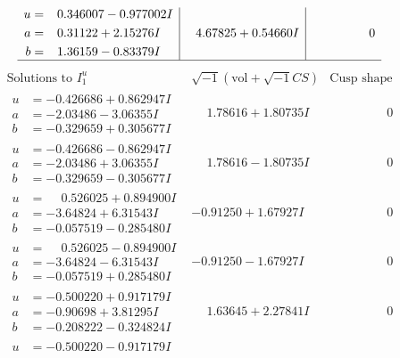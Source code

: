 \documentclass[1p]{elsarticle_modified}
\theoremstyle{definition}
\newcommand{\I}{\sqrt{-1}}
\begin{document}
$$\begin{array}{c|c|c}
\begin{aligned}
u &= \phantom{-}0.346007 - 0.977002 I \\
a &= \phantom{-}0.31122 + 2.15276 I \\
b &= \phantom{-}1.36159 - 0.83379 I\end{aligned}
 & \phantom{-}4.67825 + 0.54660 I & \phantom{-0.000000 } 0\\
 \hline 
 \end{array}$$\newpage$$\begin{array}{c|c|c}  
\text{Solutions to }I^u_{1}& \I (\text{vol} + \sqrt{-1}CS) & \text{Cusp shape}\\
 \hline 
\begin{aligned}
u &= -0.426686 + 0.862947 I \\
a &= -2.03486 - 3.06355 I \\
b &= -0.329659 + 0.305677 I\end{aligned}
 & \phantom{-}1.78616 + 1.80735 I & \phantom{-0.000000 } 0 \\ \hline\begin{aligned}
u &= -0.426686 - 0.862947 I \\
a &= -2.03486 + 3.06355 I \\
b &= -0.329659 - 0.305677 I\end{aligned}
 & \phantom{-}1.78616 - 1.80735 I & \phantom{-0.000000 } 0 \\ \hline\begin{aligned}
u &= \phantom{-}0.526025 + 0.894900 I \\
a &= -3.64824 + 6.31543 I \\
b &= -0.057519 - 0.285480 I\end{aligned}
 & -0.91250 + 1.67927 I & \phantom{-0.000000 } 0 \\ \hline\begin{aligned}
u &= \phantom{-}0.526025 - 0.894900 I \\
a &= -3.64824 - 6.31543 I \\
b &= -0.057519 + 0.285480 I\end{aligned}
 & -0.91250 - 1.67927 I & \phantom{-0.000000 } 0 \\ \hline\begin{aligned}
u &= -0.500220 + 0.917179 I \\
a &= -0.90698 + 3.81295 I \\
b &= -0.208222 - 0.324824 I\end{aligned}
 & \phantom{-}1.63645 + 2.27841 I & \phantom{-0.000000 } 0 \\ \hline\begin{aligned}
u &= -0.500220 - 0.917179 I \\

\end{aligned}
\end{array}$$
\end{document}
